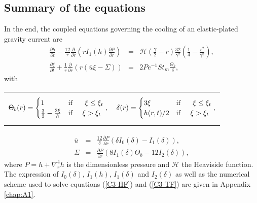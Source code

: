 \subsection{Summary of the equations}
\label{C3-sec:summary-equations}

In  the  end,  the  coupled  equations governing  the  cooling  of  an
elastic-plated gravity current are
\begin{eqnarray}
  \frac{\partial h}{\partial t}-\frac{12}{r}
  \frac{\partial}{\partial      r}
  \left( r I_1(h) \frac{\partial P}{\partial
  r}\right)
  \label{C3-HF}
  & =& \mathcal{H}(\frac{\gamma}{2}-r)\frac{32}{\gamma^{2}}\left(\frac{1}{4}-\frac{r^{2}}{\gamma^{2}}\right),\\
  \frac{\partial                                       \xi}{\partial
  t}+\frac{1}{r}\frac{\partial}{\partial                          r}
  \left( r\left(\bar{u}\xi-\Sigma\right)\right)&=&2Pe^{-1}St_m\frac{\Theta_b}{\delta},\label{C3-TF}
\end{eqnarray}
with

\begin{tabular}{p{6cm}p{6cm}}
{
\begin{equation}
    \Theta_b(r)=
    \begin{cases}
      1 &\text{if } \hspace{.5cm} \xi\leq \xi_t \nonumber\\
      \frac{3}{2}-\frac{3\xi}{h} & \text{if} \hspace{.5cm} \xi > \xi_t\nonumber
    \end{cases},
  \end{equation}
                                   }
&
{
  \begin{equation}
    \delta(r)=
    \begin{cases}
      3\xi &\text{if } \hspace{.5cm} \xi\leq \xi_t\\
      h(r,t)/2 & \text{if} \hspace{.5cm} \xi > \xi_t\nonumber\\
    \end{cases},
  \end{equation}
  }
\end{tabular}
\begin{eqnarray}
  \overline{u}&=& \frac{12}{\delta}\frac{\partial P}{\partial r}\left(\delta
                  I_0(\delta)-I_1(\delta)\right) \label{C3-ubarF},\\
  \Sigma     &=& \frac{\partial     P}{\partial
                 r}\left(8I_1(\delta)\Theta_b-12I_2(\delta)\right),\label{C3-SigmaF}
\end{eqnarray}
where  $P   =  h+\nabla_r^4h$   is  the  dimensionless   pressure  and
$\mathcal{H}$   the    Heaviside   function.    The    expression   of
$I_0(\delta)$, $I_1(h)$,  $I_1(\delta)$ and  $I_2(\delta)$ as  well as
the  numerical  scheme  used  to  solve  equations  (\ref{C3-HF})  and
(\ref{C3-TF}) are given in Appendix \ref{chap:A1}.

